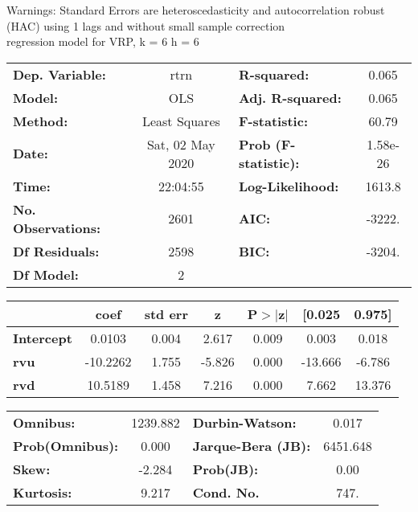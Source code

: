 Warnings: \newline
 [1] Standard Errors are heteroscedasticity and autocorrelation robust (HAC) using 1 lags and without small sample correction\\ 

regression model for VRP, k = 6 h = 6\begin{center}
\begin{tabular}{lclc}
\toprule
\textbf{Dep. Variable:}    &       rtrn       & \textbf{  R-squared:         } &     0.065   \\
\textbf{Model:}            &       OLS        & \textbf{  Adj. R-squared:    } &     0.065   \\
\textbf{Method:}           &  Least Squares   & \textbf{  F-statistic:       } &     60.79   \\
\textbf{Date:}             & Sat, 02 May 2020 & \textbf{  Prob (F-statistic):} &  1.58e-26   \\
\textbf{Time:}             &     22:04:55     & \textbf{  Log-Likelihood:    } &    1613.8   \\
\textbf{No. Observations:} &        2601      & \textbf{  AIC:               } &    -3222.   \\
\textbf{Df Residuals:}     &        2598      & \textbf{  BIC:               } &    -3204.   \\
\textbf{Df Model:}         &           2      & \textbf{                     } &             \\
\bottomrule
\end{tabular}
\begin{tabular}{lcccccc}
                   & \textbf{coef} & \textbf{std err} & \textbf{z} & \textbf{P$> |$z$|$} & \textbf{[0.025} & \textbf{0.975]}  \\
\midrule
\textbf{Intercept} &       0.0103  &        0.004     &     2.617  &         0.009        &        0.003    &        0.018     \\
\textbf{rvu}       &     -10.2262  &        1.755     &    -5.826  &         0.000        &      -13.666    &       -6.786     \\
\textbf{rvd}       &      10.5189  &        1.458     &     7.216  &         0.000        &        7.662    &       13.376     \\
\bottomrule
\end{tabular}
\begin{tabular}{lclc}
\textbf{Omnibus:}       & 1239.882 & \textbf{  Durbin-Watson:     } &    0.017  \\
\textbf{Prob(Omnibus):} &   0.000  & \textbf{  Jarque-Bera (JB):  } & 6451.648  \\
\textbf{Skew:}          &  -2.284  & \textbf{  Prob(JB):          } &     0.00  \\
\textbf{Kurtosis:}      &   9.217  & \textbf{  Cond. No.          } &     747.  \\
\bottomrule
\end{tabular}
\end{center}

